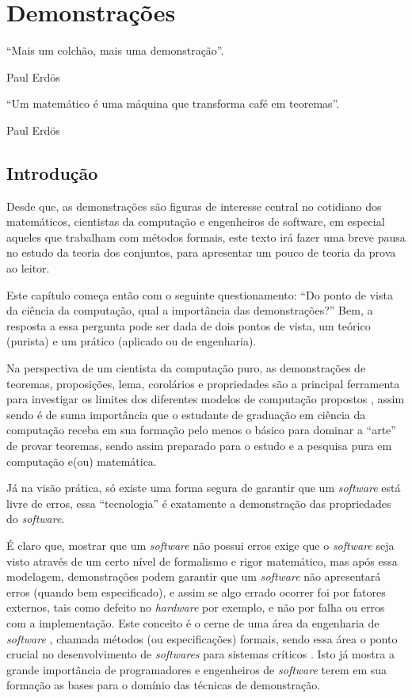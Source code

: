 \chapter{Demonstrações}\label{cap:Proofs}

\epigraph{``Mais um colchão, mais uma demonstração''.}{Paul Erdös}

\epigraph{``Um matemático é uma máquina que transforma café em teoremas''.}{Paul Erdös}

\section{Introdução}\label{sec:Introducao}

Desde que, as demonstrações são figuras de interesse central no cotidiano dos matemáticos, cientistas da computação e engenheiros de software, em especial aqueles que trabalham com métodos formais, este texto irá fazer uma breve pausa no estudo da teoria dos conjuntos, para apresentar um pouco de teoria da prova ao leitor.

Este capítulo começa então com o seguinte questionamento: ``Do ponto de vista da ciência da computação, qual a importância das demonstrações?'' Bem, a resposta a essa pergunta pode ser dada de dois pontos de vista, um teórico (purista) e um prático (aplicado ou de engenharia).

Na perspectiva de um cientista da computação puro, as demonstrações de teoremas, proposições, lema, corolários e propriedades são a principal ferramenta para investigar os limites dos diferentes modelos de computação propostos \cite{hopcroft2008, linz2006}, assim sendo é de suma importância que o estudante de graduação em ciência da computação receba em sua formação pelo menos o básico para dominar a ``arte'' de provar teoremas, sendo assim preparado para o estudo e a pesquisa pura em computação e(ou) matemática.

Já na visão prática, só existe uma forma segura de garantir que um \textit{software} está livre de erros, essa ``tecnologia'' é exatamente a demonstração das propriedades do \textit{software}. 

É claro que, mostrar que um \textit{software} não possui erros exige que o \textit{software} seja visto através de um certo nível de formalismo e rigor matemático, mas após essa modelagem, demonstrações podem garantir que um \textit{software} não apresentará erros (quando bem especificado), e assim se algo errado ocorrer foi por fatores externos, tais como defeito no \textit{hardware} por exemplo, e não por falha ou erros com a implementação. Este conceito é o cerne de uma área da engenharia de \textit{software} \cite{pressman2016}, chamada métodos  (ou especificações) formais, sendo essa área o ponto crucial no desenvolvimento de \textit{softwares} para sistemas críticos \cite{sommerville2011}. Isto já mostra a grande importância de programadores e engenheiros de \textit{software} terem em sua formação as bases para o domínio das técnicas de demonstração.


